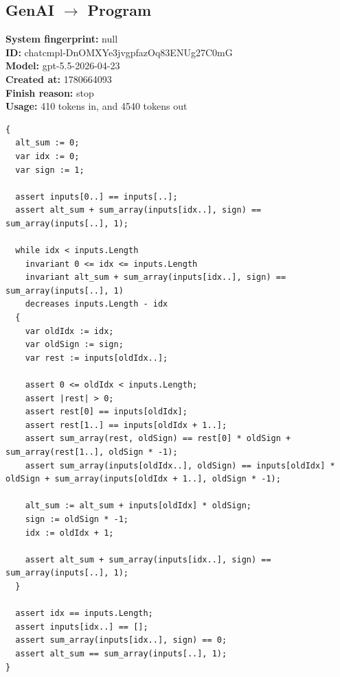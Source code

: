 \documentclass{article}
\begin{document}
\subsection*{GenAI $\rightarrow$ Program}
\textbf{System fingerprint: }null
\\\textbf{ID: }chatcmpl-DnOMXYe3jvgpfazOq83ENUg27C0mG
\\\textbf{Model: }gpt-5.5-2026-04-23
\\\textbf{Created at: }1780664093
\\\textbf{Finish reason: }stop
\\\textbf{Usage: }410 tokens in, and 4540 tokens out
\begin{lstlisting}
{
  alt_sum := 0;
  var idx := 0;
  var sign := 1;

  assert inputs[0..] == inputs[..];
  assert alt_sum + sum_array(inputs[idx..], sign) == sum_array(inputs[..], 1);

  while idx < inputs.Length
    invariant 0 <= idx <= inputs.Length
    invariant alt_sum + sum_array(inputs[idx..], sign) == sum_array(inputs[..], 1)
    decreases inputs.Length - idx
  {
    var oldIdx := idx;
    var oldSign := sign;
    var rest := inputs[oldIdx..];

    assert 0 <= oldIdx < inputs.Length;
    assert |rest| > 0;
    assert rest[0] == inputs[oldIdx];
    assert rest[1..] == inputs[oldIdx + 1..];
    assert sum_array(rest, oldSign) == rest[0] * oldSign + sum_array(rest[1..], oldSign * -1);
    assert sum_array(inputs[oldIdx..], oldSign) == inputs[oldIdx] * oldSign + sum_array(inputs[oldIdx + 1..], oldSign * -1);

    alt_sum := alt_sum + inputs[oldIdx] * oldSign;
    sign := oldSign * -1;
    idx := oldIdx + 1;

    assert alt_sum + sum_array(inputs[idx..], sign) == sum_array(inputs[..], 1);
  }

  assert idx == inputs.Length;
  assert inputs[idx..] == [];
  assert sum_array(inputs[idx..], sign) == 0;
  assert alt_sum == sum_array(inputs[..], 1);
}
\end{lstlisting}
\end{document}
